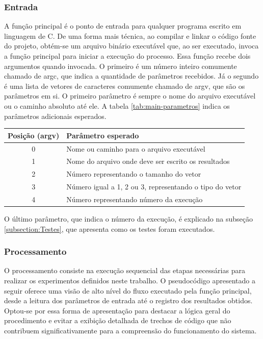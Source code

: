 \subsubsection{Entrada}
A função principal é o ponto de entrada para qualquer programa escrito em linguagem de C. De uma forma mais técnica, ao compilar e linkar o código fonte do projeto, obtém-se um arquivo binário executável que, ao ser executado, invoca a função principal para iniciar a execução do processo. Essa função recebe dois argumentos quando invocada. O primeiro é um número inteiro comumente chamado de argc, que indica a quantidade de parâmetros recebidos. Já o segundo é uma lista de vetores de caracteres comumente chamado de argv, que são os parâmetros em si. O primeiro parâmetro é sempre o nome do arquivo executável ou o caminho absoluto até ele. A tabela \ref{tab:main-parametros} indica os parâmetros adicionais esperados.
\begin{table}[H]
    \centering
    \begin{tabular}{ | c | l | }
        \hline
        Posição (argv) & Parâmetro esperado\\
        \hline
        0              & Nome ou caminho para o arquivo executável\\
        1              & Nome do arquivo onde deve ser escrito os resultados\\
        2              & Número representando o tamanho do vetor\\
        3              & Número igual a 1, 2 ou 3, representando o tipo do vetor\\
        4              & Número representando número da execução\\
        \hline
    \end{tabular}
\end{table}

O último parâmetro, que indica o número da execução, é explicado na subseção \ref{subsection:Testes}, que apresenta como os testes foram executados.

\subsubsection{Processamento}
O processamento consiste na execução sequencial das etapas necessárias para realizar os experimentos definidos neste trabalho. O pseudocódigo apresentado a seguir oferece uma visão de alto nível do fluxo executado pela função principal, desde a leitura dos parâmetros de entrada até o registro dos resultados obtidos. Optou-se por essa forma de apresentação para destacar a lógica geral do procedimento e evitar a exibição detalhada de trechos de código que não contribuem significativamente para a compreensão do funcionamento do sistema.

